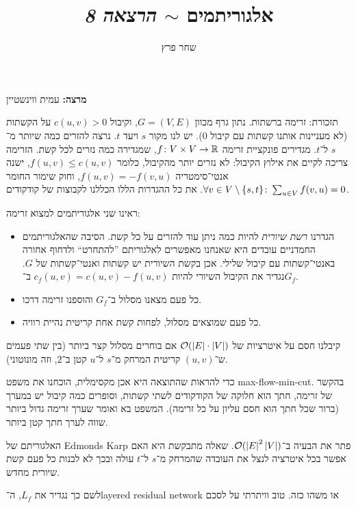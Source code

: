 \documentclass[]{../../../../tex/classes/styledArticle}
\author{שחר פרץ}
\title{אלגוריתמים $\sim$ \textit{הרצאה 8}}
\begin{document}
	\maketitle
	\textbf{מרצה: }עמית ווינשטיין
	
	תזכורת: זרימה ברשתות. נתון גרף מכוון $G = (V, E)$, וקיבול $c(u, v) > 0$ על הקשתות (לא מעניינות אותנו קשתות עם קיבול $0$). יש לנו מקור $s$ ויעד $t$. נרצה להזרים כמה שיותר מ־$s$ ל־$t$. מגדירים פונקציית זרימה $f \colon V \times V \to \mathbb{R}$, שמגדירה כמה נזרים לכל קשת. הזרימה צריכה לקיים את אילוץ הקיבול: לא נזרים יותר מהקיבול, כלומר $f(u, v) \le c(u, v)$, ישנה אנטי־סימטריה $f(u, v) = -f(v, u)$, וחוק שימור החומר $\forall v \in V \setminus \{s, t\} \colon \sum_{u \in V} f(v, u) = 0$. את כל ההגדרות הללו הכללנו לקבוצות של קודקודים. 
	
	ראינו שני אלגוריתמים למצוא זרימה: 
	\begin{itemize}
		\item הגדרנו \textit{רשת שיורית} להיות כמה ניתן עוד להזרים על כל קשת. הסיבה שהאלגוריתמים החמדניים עובדים היא שאנחנו מאפשרים לאלגוריתם ''להתחרט`` ולדחוף אחורה באנטי־קשתות עם קיבול שלילי. אכן בקשת השיורית יש קשתות ואנטי־קשתות של $G$. נגדיר את הקיבול השיורי להיות $c_{f}(u, v) = c(u, v) - f(u, v)$ ב־$G_f$. 
		\item כל פעם מצאנו מסלול ב־$G_f$ והוספנו זרימה דרכו. 
		\item כל פעם שמוצאים מסלול, לפחות קשת אחת קריטית נהיית רוויה. 
	\end{itemize}
	קיבלנו חסם על איטרציות של $\mathcal{O}(\left \lvert E \right \rvert \cdot \left \lvert V \right \rvert)$ אם בוחרים מסלול קצר ביותר (בין שתי פעמים ש־$(u, v)$ קריטית המרחק מ־$s$ ל־$u$ קטן ב־$2$, וזה מונוטוני). 
	
	כדי להראות שהתוצאה היא אכן מקסימלית, הוכחנו את משפט max-flow-min-cut. בהקשר של זרימה, חתך הוא חלוקה של הקודקודים לשתי קשתות, וסופרים כמה קיבול יש במערך (ברור שכל חתך הוא חסם עליון על כל זרימה). המשפט בא ואומר שערך זרימה גדול ביותר שווה לערך חתך קטן ביותר. 
	
	האלגוריתם של Edmonds Karp פתר את הבעיה ב־$\mathcal{O}(\left \lvert E \right \rvert^2 \left \lvert V \right \rvert)$. שאלה מתבקשת היא האם אפשר בכל איטרציה לנצל את העובדה שהמרחק מ־$s$ ל־$t$ עולה ובכך לא לבנות כל פעם קשת שיורית מחדש. 
	
	לשם כך נגדיר את $L_f$, ה‏־layered residual network או משהו כזה. טוב וויתרתי על לסכם
	
\end{document}
